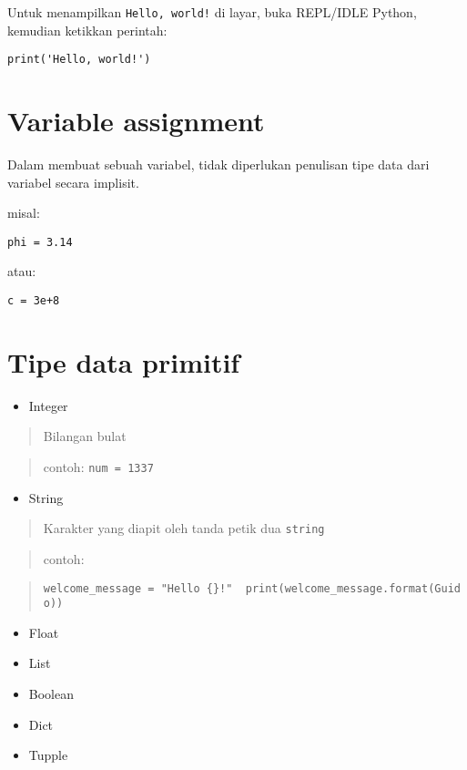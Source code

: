 Untuk menampilkan \texttt{Hello,\ world!} di layar, buka REPL/IDLE
Python, kemudian ketikkan perintah:

\begin{verbatim}
print('Hello, world!')
\end{verbatim}

\section{Variable assignment}\label{variable-assignment}

Dalam membuat sebuah variabel, tidak diperlukan penulisan tipe data dari
variabel secara implisit.

misal:

\begin{verbatim}
phi = 3.14
\end{verbatim}

atau:

\begin{verbatim}
c = 3e+8
\end{verbatim}

\section{Tipe data primitif}\label{tipe-data-primitif}

\begin{itemize}
\tightlist
\item
  Integer
\end{itemize}

\begin{quote}
Bilangan bulat
\end{quote}

\begin{quote}
contoh: \texttt{num\ =\ 1337}
\end{quote}

\begin{itemize}
\tightlist
\item
  String
\end{itemize}

\begin{quote}
Karakter yang diapit oleh tanda petik dua
\texttt{\textquotesingle{}string\textquotesingle{}}
\end{quote}

\begin{quote}
contoh:
\end{quote}

\begin{quote}
\texttt{welcome\_message\ =\ "Hello\ \{\}!"\ \ print(welcome\_message.format(\textquotesingle{}Guido\textquotesingle{}))}
\end{quote}

\begin{itemize}
\item
  Float
\item
  List
\item
  Boolean
\item
  Dict
\item
  Tupple
\end{itemize}

